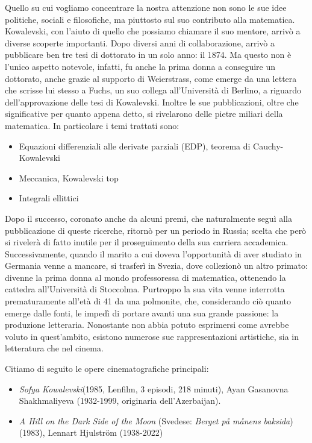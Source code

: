 Quello su cui vogliamo concentrare la nostra attenzione non sono le sue idee politiche, sociali e filosofiche, ma piuttosto sul suo contributo alla matematica. Kowalevski, con l'aiuto di quello che possiamo chiamare il suo mentore, arrivò a diverse scoperte importanti. Dopo diversi anni di collaborazione, arrivò a pubblicare ben tre tesi di dottorato in un solo anno: il 1874. Ma questo non è l'unico aspetto notevole, infatti, fu anche la prima donna a conseguire un dottorato, anche grazie al supporto di Weierstrass, come emerge da una lettera che scrisse lui stesso a Fuchs, un suo collega all'Università di Berlino, a riguardo dell'approvazione delle tesi di Kowalevski. Inoltre le sue pubblicazioni, oltre che significative per quanto appena detto, si rivelarono delle pietre miliari della matematica. In particolare i temi trattati sono:
\begin{itemize}
\item Equazioni differenziali alle derivate parziali (EDP), teorema di Cauchy-Kowalevski
\item Meccanica, Kowalevski top
\item Integrali ellittici
\end{itemize}


Dopo il successo, coronato anche da alcuni premi, che naturalmente seguì alla pubblicazione di queste ricerche, ritornò per un periodo in Russia; scelta che però si rivelerà di fatto inutile per il proseguimento della sua carriera accademica. Successivamente, quando il marito a cui doveva l'opportunità di aver studiato in Germania venne a mancare, si trasferì in Svezia, dove collezionò un altro primato: divenne la prima donna al mondo professoressa di matematica, ottenendo la cattedra all'Università di Stoccolma.
Purtroppo la sua vita venne interrotta prematuramente all'età di 41 da una polmonite, che, considerando ciò quanto emerge dalle fonti, le impedì di portare avanti una sua grande passione: la produzione letteraria.
Nonostante non abbia potuto esprimersi come avrebbe voluto in quest'ambito, esistono numerose sue rappresentazioni artistiche, sia in letteratura che nel cinema.

Citiamo di seguito le opere cinematografiche principali:
\begin{itemize}
\emergencystretch 3em
\item \textit{Sofya Kowalevski}(1985, Lenfilm, 3 episodi, 218 minuti), Ayan Gasanovna Shakhmaliyeva (1932-1999,
originaria dell'Azerbaijan).

\item \textit{A Hill on the Dark Side of the Moon} (Svedese: \textit{Berget på månens baksida})(1983), Lennart Hjulström (1938-2022)
\end{itemize}

